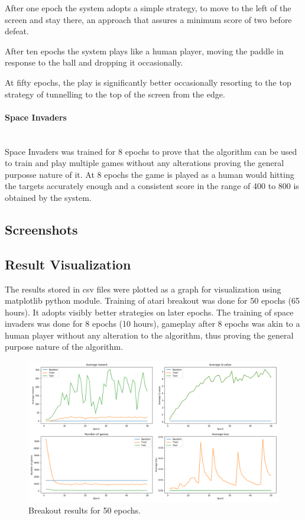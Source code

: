 \documentclass[a4paper,11pt]{article}
\newcommand{\mparagraph}[1]{\paragraph{#1}\mbox{}\\}
\begin{document}
				After one epoch the system adopts a simple strategy, to move to the left of the screen and stay there, an approach that assures a minimum score of two before defeat.

				After ten epochs the system plays like a human player, moving the paddle in response to the ball and dropping it occasionally.

				At fifty epochs, the play is significantly better occasionally resorting to the top strategy of tunnelling to the top of the screen from the edge.

			\mparagraph{Space Invaders}
				Space Invaders was trained for 8 epochs to prove that the algorithm can be used to train and play multiple games without any alterations proving the general purposse nature of it. At 8 epochs the game is played as a human would hitting the targets accurately enough and a consistent score in the range of 400 to 800 is obtained by the system.

		\subsection{Screenshots}
		\subsection{Result Visualization}
			The results stored in csv files were plotted as a graph for visualization using matplotlib python module. Training of atari breakout was done for 50 epochs (65 hours). It  adopts visibly better strategies on later epochs. The training of space invaders was done for 8 epochs (10 hours), gameplay after 8 epochs was akin to a human player without any alteration to the algorithm, thus proving the general purpose nature of the algorithm.

			\begin{figure}[!h]
				\begin{centering}
					\includegraphics[width=15cm]{images/breakout.png}
					\caption{Breakout results for 50 epochs.}
				\end{centering}
			\end{figure}			
			
\end{document}
